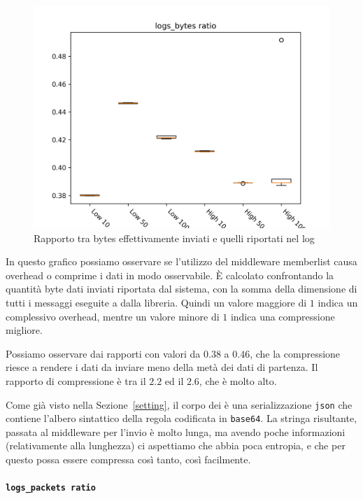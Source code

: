 \documentclass[target=bach]{thud}
\begin{document}
\begin{figure}[H]
    \centering
    \includegraphics[width=0.7\linewidth, keepaspectratio]{graphs/logs_bytes ratio.png}
    \caption{Rapporto tra bytes effettivamente inviati e quelli riportati nel log}
    \label{fig:lbr}
\end{figure}

In questo grafico possiamo osservare se l'utilizzo del middleware memberlist causa overhead o comprime i dati in modo osservabile.
È calcolato confrontando la quantità byte dati inviati riportata dal sistema, con la somma della dimensione di tutti i messaggi eseguite a dalla libreria. Quindi un valore maggiore di $1$ indica un complessivo overhead, mentre un valore minore di $1$ indica una compressione migliore.

Possiamo osservare dai rapporti con valori da $0.38$ a $0.46$, che la compressione riesce a rendere i dati da inviare meno della metà dei dati di partenza.
Il rapporto di compressione è tra il $2.2$ ed il $2.6$, che è molto alto.

Come già visto nella Sezione~\ref{setting}, il corpo dei è una serializzazione \lstinline{json} che contiene l'albero sintattico della regola codificata in \lstinline{base64}.
La stringa risultante, passata al middleware per l'invio è molto lunga, ma avendo poche informazioni (relativamente alla lunghezza) ci aspettiamo che abbia poca entropia, e che per questo possa essere compressa così tanto, così facilmente.

\paragraph{\lstinline{logs_packets ratio}}
\end{document}

